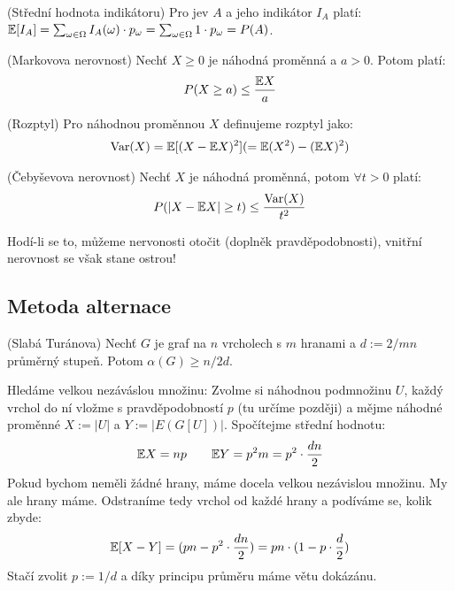 \poz (Střední hodnota indikátoru) Pro jev $A$ a jeho indikátor $I_A$ platí: 
$\mathbb{E}[I_A] = \sum_{\omega \in \Omega} I_A(\omega) \cdot p_\omega = \sum_{\omega 
\in \Omega} 1 \cdot p_\omega = P(A)$.

\vt (Markovova nerovnost) Nechť $X \geq 0$ je náhodná proměnná a $a > 0$. Potom 
platí:
\begin{align}
	P(X \geq a) \leq {\mathbb{E}X \over a}
\end{align}

\df (Rozptyl) Pro náhodnou proměnnou $X$ definujeme rozptyl jako:
\begin{align}
	\operatorname{Var}(X) = \mathbb{E}[(X - \mathbb{E} X)^2] ( = \mathbb{E}(X^2) - (\mathbb{E} X)^2 )
\end{align}

\vt (Čebyševova nerovnost) Nechť $X$ je náhodná proměnná, potom $\forall t > 0$ 
platí:
\begin{align}
	P(|X - \mathbb{E} X| \geq t) \leq {\operatorname{Var}(X) \over t^2}
\end{align}

\pzn Hodí-li se to, můžeme nervonosti otočit (doplněk pravděpodobnosti), vnitřní
nerovnost se však stane ostrou!



\subsection{Metoda alternace}

\vt (Slabá Turánova) Nechť $G$ je graf na $n$ vrcholech s $m$ hranami a $d := 
2/mn$ průměrný stupeň. Potom $\alpha(G) \geq n/2d$.

\dk Hledáme velkou nezáváslou množinu: Zvolme si náhodnou podmnožinu $U$, každý 
vrchol do ní vložme s pravděpodobností $p$ (tu určíme později) a mějme náhodné 
proměnné $X := |U|$ a $Y := |E(G[U])|$. Spočítejme střední hodnotu:
\begin{align}
	\mathbb{E} X = np \qquad \mathbb{E} Y = p^2 m = p^2 \cdot {dn \over 2 }
\end{align}
Pokud bychom neměli žádné hrany, máme docela velkou nezávislou množinu. My ale 
hrany máme. Odstraníme tedy vrchol od každé hrany a podíváme se, kolik zbyde:
\begin{align}
	\mathbb{E}[X - Y] = (pn - p^2 \cdot {dn \over 2}) = pn \cdot (1-p \cdot {d \over 2})
\end{align}
Stačí zvolit $ p := 1/d$ a díky principu průměru máme větu dokázánu.

